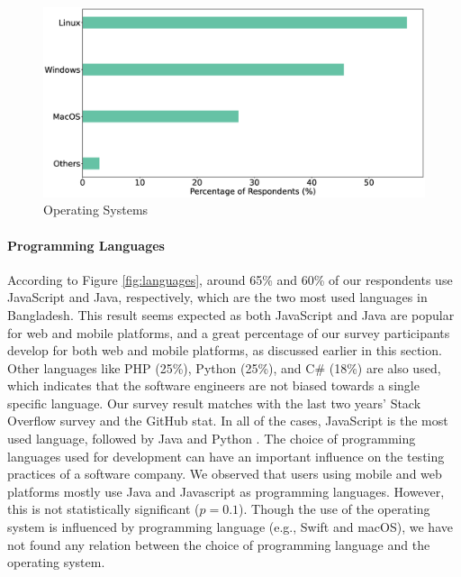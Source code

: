 \begin{figure}[h]
\centering
  \includegraphics[scale=0.17]{Figures/Respondents_os}
  \caption{Operating Systems}
  \label{fig:os}
\end{figure}


\paragraph{Programming Languages}
According to Figure \ref{fig:languages}, around 65\% and 60\% of our respondents use JavaScript and Java, respectively, which are the two most used languages in Bangladesh. This result seems expected as both JavaScript and Java are popular for web and mobile platforms, and a great percentage of our survey participants develop for both web and mobile platforms, as discussed earlier in this section. Other languages like PHP (25\%), Python (25\%), and C\# (18\%) are also used, which indicates that the software engineers are not biased towards a single specific language. Our survey result matches with the last two years' Stack Overflow survey and the GitHub stat. In all of the cases, JavaScript is the most used language, followed by Java and Python \cite{StackoverflowSurvey2020, StackoverflowSurvey2019, GithubStat}. The choice of programming languages used for development can have an important influence on the testing practices of a software company. We observed that users using mobile and web platforms mostly use Java and Javascript as programming languages. However, this is not statistically significant ($p=0.1$). Though the use of the operating system is influenced by programming language (e.g., Swift and macOS), we have not found any relation between the choice of programming language and the operating system.


